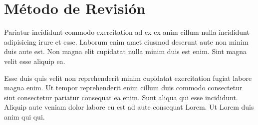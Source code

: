\section{Método de Revisión}\label{sec:metodo-revision}
Pariatur incididunt commodo exercitation ad ex ex anim cillum nulla incididunt adipisicing irure et esse. Laborum enim amet eiusmod deserunt aute non minim duis aute est. Non magna elit cupidatat nulla minim duis est enim. Sint magna velit esse aliquip ea.

Esse duis quis velit non reprehenderit minim cupidatat exercitation fugiat labore magna enim. Ut tempor reprehenderit enim cillum duis commodo consectetur sint consectetur pariatur consequat ea enim. Sunt aliqua qui esse incididunt. Aliquip aute veniam dolor labore eu est ad aute consequat Lorem. Ut Lorem duis anim qui qui.












